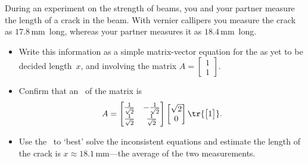 






\sectionExercises


\begin{exercise} \label{ex:} 
During an experiment on the strength of beams, you and your partner measure the length of a crack in the beam.
With vernier callipers you measure the crack as \(17.8\)\,mm~long, whereas your partner measures it as \(18.4\)\,mm~long.
\begin{itemize}
\item Write this information as a simple matrix-vector equation for the as yet to be decided length~\(x\), and involving the matrix \(A=\begin{bmatrix} 1\\1 \end{bmatrix}\).
\item Confirm that an \svd\ of the matrix is
\begin{equation*}
A=\begin{bmatrix} \frac1{\sqrt2}&-\frac1{\sqrt2}
\\\frac1{\sqrt2}&\frac1{\sqrt2} \end{bmatrix}
\begin{bmatrix} \sqrt2\\0 \end{bmatrix}
\tr{\begin{bmatrix} 1 \end{bmatrix}}.
\end{equation*}
\item Use the \svd\ to `best' solve the inconsistent equations and estimate the length of the crack is \(x\approx 18.1\)\,mm---the average of the two measurements.
\end{itemize}
\end{exercise}



